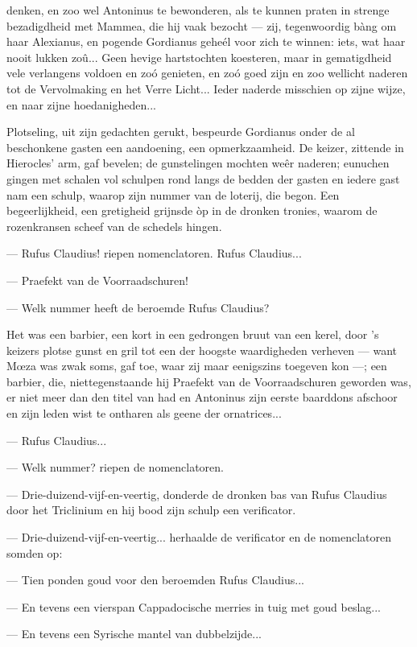 \documentclass[a4paper, 12pt, oneside, dutch]{article}
\begin{document}
denken, en zoo wel Antoninus te bewonderen, als te kunnen praten in strenge bezadigdheid met Mammea, die hij vaak bezocht --- zij, tegenwoordig bàng om haar Alexianus, en pogende Gordianus geheél voor zich te winnen: iets, wat haar nooit lukken zoû... Geen hevige hartstochten koesteren, maar in gematigdheid vele verlangens voldoen en zoó genieten, en zoó goed zijn en zoo wellicht naderen tot de Vervolmaking en het Verre Licht... Ieder naderde misschien op zijne wijze, en naar zijne hoedanigheden...

Plotseling, uit zijn gedachten gerukt, bespeurde Gordianus onder de al beschonkene gasten een aandoening, een opmerkzaamheid. De keizer, zittende in Hierocles' arm, gaf bevelen; de gunstelingen mochten weêr naderen; eunuchen gingen met schalen vol schulpen rond langs de bedden der gasten en iedere gast nam een schulp, waarop zijn nummer van de loterij, die begon. Een begeerlijkheid, een gretigheid grijnsde òp in de dronken tronies, waarom de rozenkransen scheef van de schedels hingen.

--- Rufus Claudius! riepen nomenclatoren. Rufus Claudius...

--- Praefekt van de Voorraadschuren!

--- Welk nummer heeft de beroemde Rufus Claudius?

Het was een barbier, een kort in een gedrongen bruut van een kerel, door 's keizers plotse gunst en gril tot een der hoogste waardigheden verheven --- want Mœza was zwak soms, gaf toe, waar zij maar eenigszins toegeven kon ---; een barbier, die, niettegenstaande hij Praefekt van de Voorraadschuren geworden was, er niet meer dan den titel van had en Antoninus zijn eerste baarddons afschoor en zijn leden wist te ontharen als geene der ornatrices...

--- Rufus Claudius...

--- Welk nummer? riepen de nomenclatoren.

--- Drie-duizend-vijf-en-veertig, donderde de dronken bas van Rufus Claudius door het Triclinium en hij bood zijn schulp een verificator.

--- Drie-duizend-vijf-en-veertig... herhaalde de verificator en de nomenclatoren somden op:

--- Tien ponden goud voor den beroemden Rufus Claudius...

--- En tevens een vierspan Cappadocische merries in tuig met goud beslag...

--- En tevens een Syrische mantel van dubbelzijde...
\end{document}
